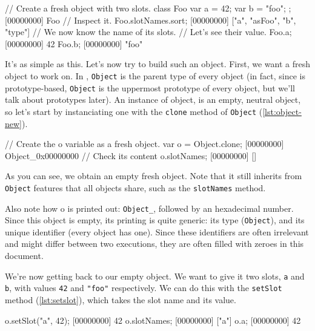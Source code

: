 \documentclass[openright,twoside,12pt]{report}
\begin{document}
\begin{urbiscript}[caption=Inspecting an \urbi object,label=lst:object-slots]
// Create a fresh object with two slots.
class Foo { var a = 42; var b = "foo"; };
[00000000] Foo
// Inspect it.
Foo.slotNames.sort;
[00000000] ["a", "asFoo", "b", "type"]
// We now know the name of its slots.
// Let's see their value.
Foo.a;
[00000000] 42
Foo.b;
[00000000] "foo"
\end{urbiscript}

It's as simple as this. Let's now try to build such an object. First,
we want a fresh object to work on. In \urbi, \texttt{Object} is the
parent type of every object (in fact, since \urbi is prototype-based,
\texttt{Object} is the uppermost prototype of every object, but we'll
talk about prototypes later). An instance of object, is an empty,
neutral object, so let's start by instanciating one with the
\texttt{clone} method of \texttt{Object} (\autoref{lst:object-new}).

\begin{urbiscript}[caption=Instanciating a new object,
  label=lst:object-new, name=object-slots]
// Create the o variable as a fresh object.
var o = Object.clone;
[00000000] Object_0x00000000
// Check its content
o.slotNames;
[00000000] []
\end{urbiscript}

As you can see, we obtain an empty fresh object. Note that it still
inherits from \texttt{Object} features that all objects share, such as
the \texttt{slotNames} method.

Also note how o is printed out: \texttt{Object\_}, followed by an
hexadecimal number. Since this object is empty, its printing is quite
generic: its type (\texttt{Object}), and its unique identifier (every
\urbi object has one). Since these identifiers are often irrelevant
and might differ between two executions, they are often filled with
zeroes in this document.

We're now getting back to our empty object. We want to give it two
slots, \texttt{a} and \texttt{b}, with values \lstinline|42| and
\lstinline|"foo"| respectively. We can do this with the
\texttt{setSlot} method (\autoref{lst:setslot}), which takes the slot name and
its value.

\begin{urbiscript}[caption=Defining slots, label=lst:setslot,
  name=object-slots]
o.setSlot("a", 42);
[00000000] 42
o.slotNames;
[00000000] ["a"]
o.a;
[00000000] 42
\end{urbiscript}
\end{document}
